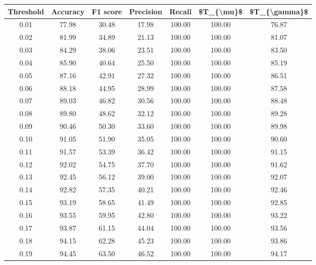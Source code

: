 \begin{tabular}{|c|c|c|c|c|c|c|}
\hline
 Threshold &  Accuracy &  F1 score &  Precision &  Recall &  \$T\_\{\textbackslash mu\}\$ &  \$T\_\{\textbackslash gamma\}\$ \\
\hline
      0.01 &     77.98 &     30.48 &      17.98 &  100.00 &     100.00 &         76.87 \\
      0.02 &     81.99 &     34.89 &      21.13 &  100.00 &     100.00 &         81.07 \\
      0.03 &     84.29 &     38.06 &      23.51 &  100.00 &     100.00 &         83.50 \\
      0.04 &     85.90 &     40.64 &      25.50 &  100.00 &     100.00 &         85.19 \\
      0.05 &     87.16 &     42.91 &      27.32 &  100.00 &     100.00 &         86.51 \\
      0.06 &     88.18 &     44.95 &      28.99 &  100.00 &     100.00 &         87.58 \\
      0.07 &     89.03 &     46.82 &      30.56 &  100.00 &     100.00 &         88.48 \\
      0.08 &     89.80 &     48.62 &      32.12 &  100.00 &     100.00 &         89.28 \\
      0.09 &     90.46 &     50.30 &      33.60 &  100.00 &     100.00 &         89.98 \\
      0.10 &     91.05 &     51.90 &      35.05 &  100.00 &     100.00 &         90.60 \\
      0.11 &     91.57 &     53.39 &      36.42 &  100.00 &     100.00 &         91.15 \\
      0.12 &     92.02 &     54.75 &      37.70 &  100.00 &     100.00 &         91.62 \\
      0.13 &     92.45 &     56.12 &      39.00 &  100.00 &     100.00 &         92.07 \\
      0.14 &     92.82 &     57.35 &      40.21 &  100.00 &     100.00 &         92.46 \\
      0.15 &     93.19 &     58.65 &      41.49 &  100.00 &     100.00 &         92.85 \\
      0.16 &     93.55 &     59.95 &      42.80 &  100.00 &     100.00 &         93.22 \\
      0.17 &     93.87 &     61.15 &      44.04 &  100.00 &     100.00 &         93.56 \\
      0.18 &     94.15 &     62.28 &      45.23 &  100.00 &     100.00 &         93.86 \\
      0.19 &     94.45 &     63.50 &      46.52 &  100.00 &     100.00 &         94.17 \\

\end{tabular}
